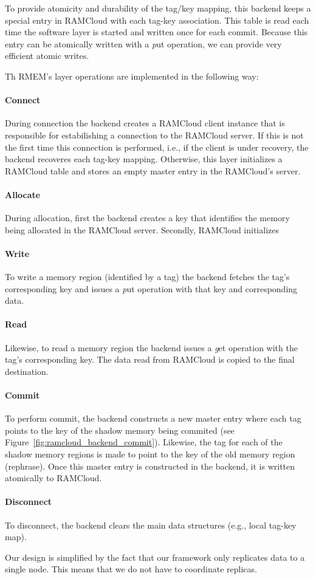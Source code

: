To provide atomicity and durability of the tag/key mapping, this backend keeps a special entry in RAMCloud with each tag-key association. This table is read each time the software layer is started and written once for each commit. Because this entry can be atomically written with a {\emph put} operation, we can provide very efficient atomic writes.

Th RMEM's layer operations are implemented in the following way:

\paragraph {\bf Connect} During connection the backend creates a RAMCloud client instance that is responsible for estabilishing a connection to the RAMCloud server.
If this is not the first time this connection is performed, i.e., if the client is under recovery, the backend recoveres each tag-key mapping.
Otherwise, this layer initializes a RAMCloud table and stores an empty master entry in the RAMCloud's server.
\paragraph{\bf Allocate} During allocation, first the backend creates a key that identifies the memory being allocated in the RAMCloud server. Secondly, RAMCloud initializes
\paragraph{\bf Write} To write a memory region (identified by a tag) the backend fetches the tag's corresponding key and issues a {\emph put } operation with that key and corresponding data.
\paragraph{\bf Read} Likewise, to read a memory region the backend issues a {\emph get} operation with the tag's corresponding key. The data read from RAMCloud is copied to the final destination.
\paragraph{\bf Commit} To perform commit, the backend constructs a new master entry where each tag points to the key of the shadow memory being commited (see Figure~\ref{fig:ramcloud_backend_commit}). Likewise, the tag for each of the shadow
memory regions is made to point to the key of the old memory region (rephrase). Once this master entry is constructed in the backend, it is written atomically to RAMCloud.
\paragraph{\bf Disconnect} To disconnect, the backend clears the main data structures (e.g., local tag-key map).

Our design is simplified by the fact that our framework only replicates data to a single node. This means that we do not have to coordinate replicas.
